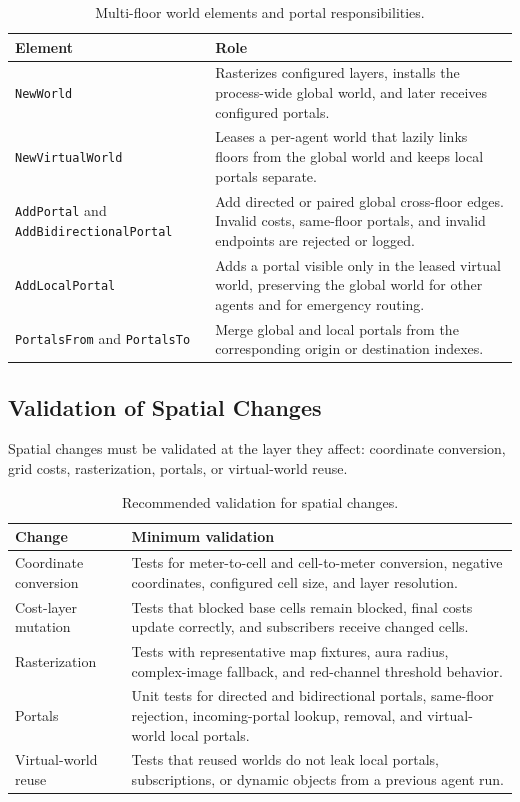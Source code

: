 \documentclass[12pt,a4paper]{report}
\begin{document}
\begin{table}[H]
\centering
\begin{tabular}{|p{}|p{}|}
\hline
\textbf{Element} & \textbf{Role} \\
\hline
\texttt{NewWorld} &
Rasterizes configured layers, installs the process-wide global world, and later
receives configured portals. \\
\hline
\texttt{NewVirtualWorld} &
Leases a per-agent world that lazily links floors from the global world and keeps
local portals separate. \\
\hline
\texttt{AddPortal} and \texttt{AddBidirectionalPortal} &
Add directed or paired global cross-floor edges. Invalid costs, same-floor
portals, and invalid endpoints are rejected or logged. \\
\hline
\texttt{AddLocalPortal} &
Adds a portal visible only in the leased virtual world, preserving the global
world for other agents and for emergency routing. \\
\hline
\texttt{PortalsFrom} and \texttt{PortalsTo} &
Merge global and local portals from the corresponding origin or destination
indexes. \\
\hline
\end{tabular}
\caption{Multi-floor world elements and portal responsibilities.}
\end{table}

\subsection{Validation of Spatial Changes}

Spatial changes must be validated at the layer they affect: coordinate
conversion, grid costs, rasterization, portals, or virtual-world reuse.

\begin{table}[H]
\centering
\begin{tabular}{|p{}|p{}|}
\hline
\textbf{Change} & \textbf{Minimum validation} \\
\hline
Coordinate conversion &
Tests for meter-to-cell and cell-to-meter conversion, negative coordinates,
configured cell size, and layer resolution. \\
\hline
Cost-layer mutation &
Tests that blocked base cells remain blocked, final costs update correctly, and
subscribers receive changed cells. \\
\hline
Rasterization &
Tests with representative map fixtures, aura radius, complex-image fallback, and
red-channel threshold behavior. \\
\hline
Portals &
Unit tests for directed and bidirectional portals, same-floor rejection,
incoming-portal lookup, removal, and virtual-world local portals. \\
\hline
Virtual-world reuse &
Tests that reused worlds do not leak local portals, subscriptions, or dynamic
objects from a previous agent run. \\
\hline
\end{tabular}
\caption{Recommended validation for spatial changes.}
\end{table}
\end{document}
